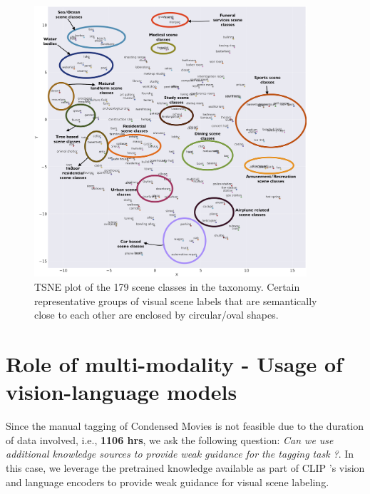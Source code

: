 \begin{figure}[h!]
    \centering
    \includegraphics[width=0.9\textwidth]{figures/tsne_hvu_slugline_combined.png}
    \caption{TSNE plot of the 179 scene classes in the taxonomy. Certain representative groups of visual scene labels that are semantically close to each other are enclosed by circular/oval shapes. }
    \label{tsneplot}
\end{figure}

\section{Role of multi-modality - Usage of vision-language models}

Since the manual tagging of Condensed Movies \cite{bain2020condensed} is not feasible due to the duration of data involved, i.e., \textbf{1106 hrs},  we ask the following question:  \textit{Can we use additional knowledge sources to provide weak guidance for the tagging task ?}. In this case, we leverage the pretrained knowledge available as part of CLIP \cite{CLIP}'s vision and language encoders to provide weak guidance for visual scene labeling. 

